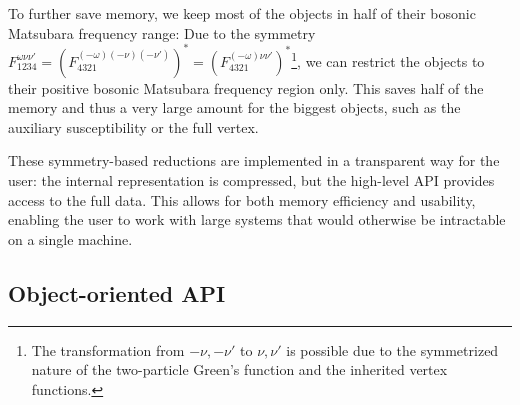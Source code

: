 \documentclass[../../main.tex]{subfiles}
\begin{document}
To further save memory, we keep most of the objects in half of their bosonic Matsubara frequency range: Due to the symmetry $F^{\omega\nu\nu'}_{\mathfrak{1234}}=(F^{(-\omega)(-\nu)(-\nu')}_{\mathfrak{4321}})^{*}=(F^{(-\omega)\nu\nu'}_{\mathfrak{4321}})^{*}$\footnote{The transformation from $-\nu, -\nu'$ to $\nu,\nu'$ is possible due to the symmetrized nature of the two-particle Green's function and the inherited vertex functions.}, we can restrict the objects to their positive bosonic Matsubara frequency region only. This saves half of the memory and thus a very large amount for the biggest objects, such as the auxiliary susceptibility or the full vertex.

These symmetry-based reductions are implemented in a transparent way for the user: the internal representation is compressed, but the high-level API provides access to the full data. This allows for both memory efficiency and usability, enabling the user to work with large systems that would otherwise be intractable on a single machine.

\subsection{Object-oriented API}
\end{document}

